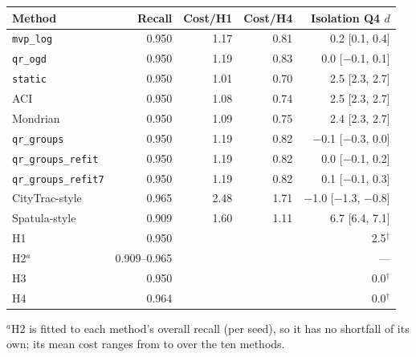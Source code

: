 \setlength{\tabcolsep}{4.5pt}
\begin{tabular}{@{}lrrrr@{}}
\toprule
Method & Recall & Cost/H1 & Cost/H4 & Isolation Q4 $d$ \\
\midrule
\texttt{mvp\_log} & 0.950 & 1.17 & 0.81 & 0.2 [0.1, 0.4] \\
\texttt{qr\_ogd} & 0.950 & 1.19 & 0.83 & 0.0 [$-$0.1, 0.1] \\
\addlinespace
\texttt{static} & 0.950 & 1.01 & 0.70 & 2.5 [2.3, 2.7] \\
ACI & 0.950 & 1.08 & 0.74 & 2.5 [2.3, 2.7] \\
Mondrian & 0.950 & 1.09 & 0.75 & 2.4 [2.3, 2.7] \\
\texttt{qr\_groups} & 0.950 & 1.19 & 0.82 & $-$0.1 [$-$0.3, 0.0] \\
\texttt{qr\_groups\_refit} & 0.950 & 1.19 & 0.82 & 0.0 [$-$0.1, 0.2] \\
\texttt{qr\_groups\_refit7} & 0.950 & 1.19 & 0.82 & 0.1 [$-$0.1, 0.3] \\
CityTrac-style & 0.965 & 2.48 & 1.71 & $-$1.0 [$-$1.3, $-$0.8] \\
Spatula-style & 0.909 & 1.60 & 1.11 & 6.7 [6.4, 7.1] \\
\addlinespace
H1 & 0.950 & & & 2.5$^\dagger$ \\
H2$^{a}$ & 0.909--0.965 & & & --- \\
H3 & 0.950 & & & 0.0$^\dagger$ \\
H4 & 0.964 & & & 0.0$^\dagger$ \\
\bottomrule
\end{tabular}

\smallskip\parbox{\textwidth}{\footnotesize $^{a}$H2 is fitted to each method's overall recall (per seed), so it has no shortfall of its own; its mean cost ranges from \ctwoHTwoCostMin{} to \ctwoHTwoCostMax{} over the ten methods.}
